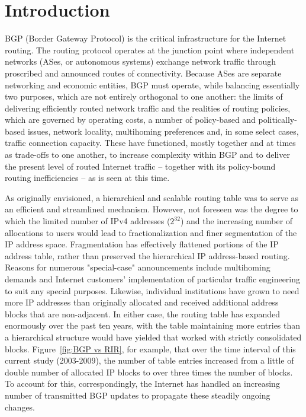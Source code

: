\section{Introduction}

BGP (Border Gateway Protocol) is the critical infrastructure for the Internet
routing. The routing protocol operates at the junction point
where independent networks (ASes, or autonomous systems) exchange network
traffic through proscribed and announced routes of connectivity. Because ASes
are separate networking and economic entities, BGP must operate, while
balancing essentially two purposes, which are not entirely orthogonal to one
another: the limits of delivering efficiently routed network traffic and the
realities of routing policies, which are governed by operating costs, a number
of policy-based and politically-based issues, network locality, multihoming
preferences and, in some select cases, traffic connection capacity. These have
functioned, mostly together and at times as trade-offs to one another, to
increase complexity within BGP and to deliver the present level of routed
Internet traffic -- together with its policy-bound routing inefficiencies --
as is seen at this time.

As originally envisioned, a hierarchical and scalable routing table was to
serve as an efficient and streamlined mechanism. However, not foreseen was the
degree to which the limited number of IPv4 addresses ($2^{32}$) and the
increasing number of allocations to users would lead to fractionalization and
finer segmentation of the IP address space. Fragmentation has effectively
flattened portions of the IP address table, rather than preserved the
hierarchical IP address-based routing. Reasons for numerous "special-case"
announcements include multihoming demands and Internet customers'
implementation of particular traffic engineering to suit any special purposes.
Likewise, individual institutions have grown to need more IP addresses than
originally allocated and received additional address blocks that are
non-adjacent. In either case, the routing table has expanded enormously over
the past ten years, with the table maintaining more entries than a
hierarchical structure would have yielded that worked with strictly
consolidated blocks. Figure~\ref{fig:BGP vs RIR}, for example, that over the
time interval of this current study (2003-2009), the number of table entries
increased from a little of double number of allocated IP blocks to over three
times the number of blocks. To account for this, correspondingly, the Internet
has handled an increasing number of transmitted BGP updates to propagate these
steadily ongoing changes.

